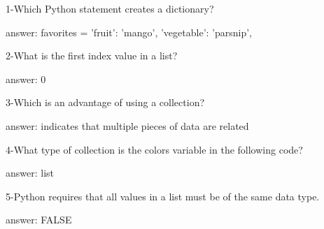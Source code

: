 1-Which Python statement creates a dictionary?


answer: favorites = {
  'fruit': 'mango',
  'vegetable': 'parsnip',
 }

2-What is the first index value in a list?


answer: 0


3-Which is an advantage of using a collection?

answer: indicates that multiple pieces of data are related

4-What type of collection is the colors variable in the following code?

answer: list

5-Python requires that all values in a list must be of the same data type.


answer: FALSE
